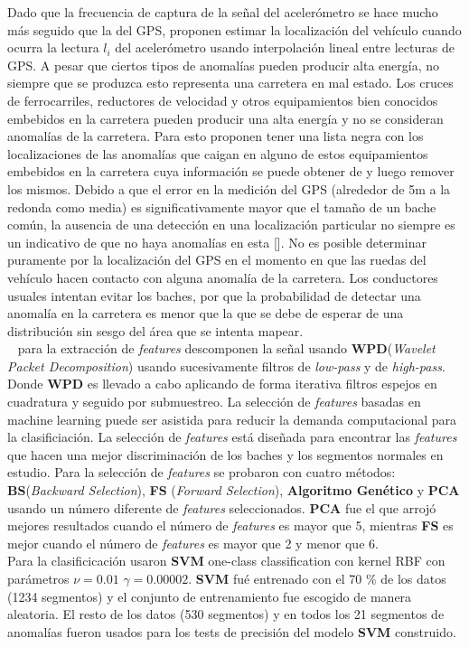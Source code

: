 Dado que la frecuencia de captura de la señal del acelerómetro se hace mucho más seguido que la del GPS, proponen estimar la localización del vehículo
cuando ocurra la lectura $l_i$ del acelerómetro usando interpolación lineal entre lecturas de GPS. A pesar que ciertos tipos de anomalías pueden producir
alta energía, no siempre que se produzca esto representa una carretera en mal estado. Los cruces de ferrocarriles, reductores de velocidad y otros
equipamientos bien conocidos embebidos en la carretera pueden producir una alta energía y no se consideran anomalías de la carretera. Para esto proponen
tener una lista negra con los localizaciones de las anomalías que caigan en alguno de estos equipamientos embebidos en la carretera cuya información se
puede obtener de y luego remover los mismos. Debido a que el error en la medición del GPS (alrededor de 5m a la redonda como media) es significativamente
mayor que el tamaño de un bache común, la ausencia de una detección en una localización particular no siempre es un indicativo de que no haya anomalías en
esta []. No es posible determinar puramente por la localización del GPS en el momento en que las ruedas del vehículo hacen contacto con alguna anomalía de
la carretera. Los conductores usuales intentan evitar los baches, por que la probabilidad de detectar una anomalía en la carretera es menor que la que se
debe de esperar de una distribución sin sesgo del área que se intenta mapear.\\

~\cite{cong2013applying} para la extracción de \emph{features} descomponen la señal usando \textbf{WPD}(\emph{Wavelet Packet Decomposition}) usando
sucesivamente filtros de \emph{low-pass} y de \emph{high-pass}. Donde \textbf{WPD} es llevado a cabo aplicando de forma iterativa filtros espejos en
cuadratura y seguido por submuestreo. La selección de \emph{features} basadas en machine learning puede ser asistida para reducir la demanda computacional
para la clasificiación. La selección de \emph{features} está diseñada para encontrar las \emph{features} que hacen una mejor discriminación de los baches
y los segmentos normales en estudio. Para la selección de \emph{features} se probaron con cuatro métodos: \textbf{BS}(\emph{Backward Selection}), \textbf{FS}
(\emph{Forward Selection}), \textbf {Algoritmo Genético} y \textbf{PCA} usando un número diferente de \emph{features} seleccionados. \textbf{PCA} fue el que
arrojó mejores resultados cuando el número de \emph{features} es mayor que 5, mientras \textbf{FS} es mejor cuando el número de
\emph{features} es mayor que 2 y menor que 6.\\
Para la clasificicación usaron \textbf{SVM} one-class classification con kernel RBF con parámetros  $\nu = 0.01$  $\gamma = 0.00002$. \textbf{SVM} fué
entrenado con el 70 \%  de los datos (1234 segmentos) y el conjunto de entrenamiento fue escogido de manera aleatoria. El resto de los datos  (530 segmentos)
y en todos los 21 segmentos de anomalías fueron usados para los tests de precisión del modelo \textbf{SVM} construido.

